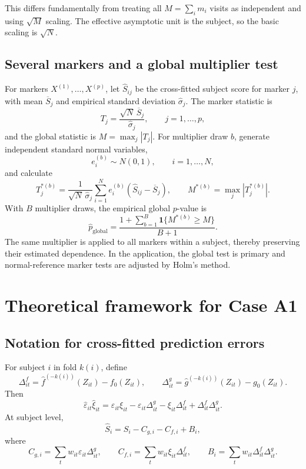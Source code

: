 \documentclass[11pt]{article}
\theoremstyle{definition}
\begin{document}
This differs fundamentally from treating all $M=\sum_i m_i$ visits as independent and using
$\sqrt M$ scaling. The effective asymptotic unit is the subject, so the basic scaling is
$\sqrt N$.

\subsection{Several markers and a global multiplier test}

For markers $X^{(1)},\ldots,X^{(p)}$, let $\widehat S_{ij}$ be the cross-fitted subject
score for marker $j$, with mean $\overline S_j$ and empirical standard deviation
$\widehat\sigma_j$. The marker statistic is
\[
T_j=\frac{\sqrt N\,\overline S_j}{\widehat\sigma_j},
\qquad j=1,\ldots,p,
\]
and the global statistic is $M=\max_j|T_j|$. For multiplier draw $b$, generate independent
standard normal variables,
\[
e_i^{(b)}\sim N(0,1),\qquad i=1,\ldots,N,
\]
and calculate
\[
T_j^{*(b)}=
\frac{1}{\sqrt N\,\widehat\sigma_j}
\sum_{i=1}^N e_i^{(b)}(\widehat S_{ij}-\overline S_j),
\qquad
M^{*(b)}=\max_j|T_j^{*(b)}|.
\]
With $B$ multiplier draws, the empirical global $p$-value is
\[
\widehat p_{\mathrm{global}}
=\frac{1+\sum_{b=1}^B\mathbf 1\{M^{*(b)}\geq M\}}{B+1}.
\]
The same multiplier is applied to all markers within a subject, thereby preserving their
estimated dependence. In the application, the global test is primary and normal-reference
marker tests are adjusted by Holm's method.

\section{Theoretical framework for Case A1}

\subsection{Notation for cross-fitted prediction errors}

For subject $i$ in fold $k(i)$, define
\[
\Delta^f_{it}
=\widehat f^{(-k(i))}(Z_{it})-f_0(Z_{it}),
\qquad
\Delta^g_{it}
=\widehat g^{(-k(i))}(Z_{it})-g_0(Z_{it}).
\]
Then
\begin{equation}
\widehat\varepsilon_{it}\widehat\xi_{it}
=
\varepsilon_{it}\xi_{it}
-\varepsilon_{it}\Delta^g_{it}
-\xi_{it}\Delta^f_{it}
+\Delta^f_{it}\Delta^g_{it}.
\label{eq:cluster-decomposition-observation}
\end{equation}
At subject level,
\begin{equation}
\widehat S_i
=S_i-C_{g,i}-C_{f,i}+B_i,
\label{eq:cluster-decomposition}
\end{equation}
where
\[
C_{g,i}=\sum_t w_{it}\varepsilon_{it}\Delta^g_{it},
\qquad
C_{f,i}=\sum_t w_{it}\xi_{it}\Delta^f_{it},
\qquad
B_i=\sum_t w_{it}\Delta^f_{it}\Delta^g_{it}.
\]
\end{document}

